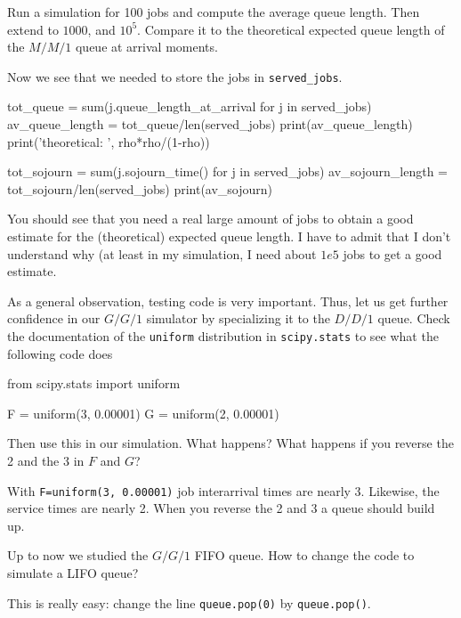 \documentclass{scrartcl}
\begin{document}
\begin{exercise}
  Run a simulation for 100 jobs and compute the average queue length. Then extend to $1000$, and $10^5$. Compare it to the theoretical expected queue length of the $M/M/1$ queue at arrival moments. 
  \begin{solution}
Now we see that we needed to store the jobs in \texttt{served\_jobs}.

    \begin{pyblock}

tot_queue = sum(j.queue_length_at_arrival for j in served_jobs)
av_queue_length = tot_queue/len(served_jobs)
print(av_queue_length)
print('theoretical: ', rho*rho/(1-rho))
      
tot_sojourn = sum(j.sojourn_time() for j in served_jobs)
av_sojourn_length = tot_sojourn/len(served_jobs)
print(av_sojourn)
\end{pyblock}

You should see that you need a real large amount of jobs to obtain a good estimate for the (theoretical) expected queue length. I have to admit that I don't understand why (at least in my simulation, I need about $1e5$ jobs to get a good estimate. 

  \end{solution}
\end{exercise}

\begin{exercise}
  As a general observation, testing code is very important. Thus, let us get further confidence in our $G/G/1$ simulator by specializing it to the $D/D/1$ queue. Check the documentation of the \texttt{uniform} distribution in \texttt{scipy.stats} to see what the following code does
  \begin{pyblock}
from scipy.stats import uniform

F = uniform(3, 0.00001)
G = uniform(2, 0.00001)
\end{pyblock}

Then use this in our simulation. What happens? What happens if you reverse the 2 and the 3 in $F$ and $G$?
\begin{solution}
  With \texttt{F=uniform(3, 0.00001)} job interarrival times are nearly 3. Likewise, the service times are nearly 2. When you reverse the 2 and 3 a queue should build up. 
\end{solution}
\end{exercise}


\begin{exercise}
  Up to now we studied the $G/G/1$ FIFO queue. How to change the code to simulate a LIFO queue?
  \begin{solution}
    This is really easy: change the line \texttt{queue.pop(0)} by  \texttt{queue.pop()}. 
 \end{solution}
\end{exercise}
\end{document}
